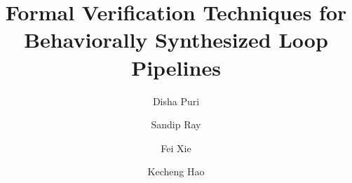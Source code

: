 \documentclass[letterpaper]{llncs}
\begin{document}
\mainmatter  %

\title{Formal Verification Techniques for Behaviorally Synthesized Loop Pipelines}

\author{Disha Puri
\and Sandip Ray 
\and Fei Xie
\and Kecheng Hao} 


\maketitle













\end{document}
